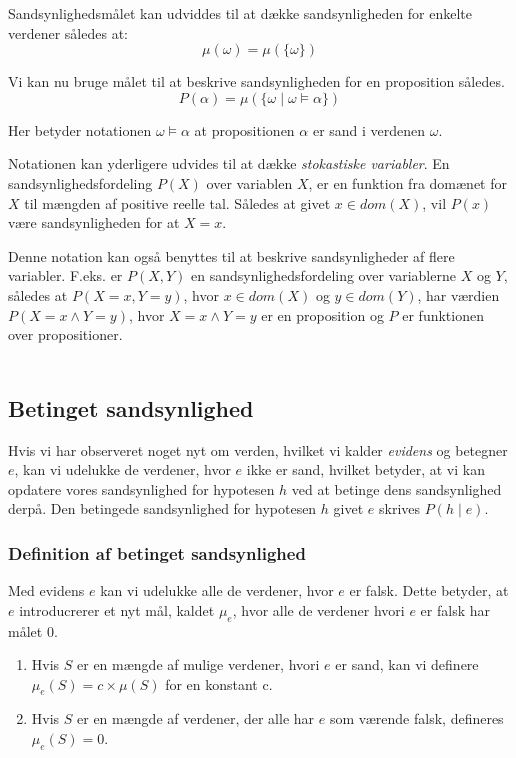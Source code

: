 Sandsynlighedsmålet kan udviddes til at dække sandsynligheden for enkelte verdener således at:
\begin{equation}
\mu(\omega) = \mu(\{\omega\})
\end{equation}


Vi kan nu bruge målet til at beskrive sandsynligheden for en proposition således.
\begin{equation}
P(\alpha) = \mu(\{\omega \mid \omega \models \alpha \})
\end{equation}

Her betyder notationen $\omega \models \alpha$ at propositionen $\alpha$ er sand i verdenen $\omega$.


Notationen kan yderligere udvides til at dække \emph{stokastiske variabler}.
En sandsynlighedsfordeling $P(X)$ over variablen $ X $, er en funktion fra
domænet for $ X $ til mængden af positive reelle tal.
Således at givet $x \in dom(X)$, vil $P(x)$ være sandsynligheden for at $X = x$.

Denne notation kan også benyttes til at beskrive sandsynligheder af flere variabler.
F.eks. er $P(X,Y)$ en sandsynlighedsfordeling over variablerne $ X $ og $ Y $, 
således at $P(X = x, Y = y)$, hvor $x \in dom(X)$ og $y \in dom(Y)$, 
har værdien $P(X = x \wedge Y = y)$, hvor
$X = x \wedge Y = y$ er en proposition og $ P $ er funktionen over propositioner. \\ \\
\cite[s. 221-222]{ArtificialIntelligence}

\subsection{Betinget sandsynlighed}

Hvis vi har observeret noget nyt om verden, hvilket vi kalder \emph{evidens} og betegner $ e $, kan vi udelukke de verdener,
hvor $ e $ ikke er sand, hvilket betyder, at vi kan opdatere vores sandsynlighed for hypotesen $ h $ ved at betinge dens sandsynlighed derpå.
Den betingede sandsynlighed for hypotesen $ h $ givet $ e $ skrives $P(h \mid e)$.


\subsubsection{Definition af betinget sandsynlighed}
Med evidens $e$ kan vi udelukke alle de verdener, hvor $e$ er falsk.
Dette betyder, at $e$ introducrerer et nyt mål, kaldet $\mu_e$, hvor
alle de verdener hvori $e$ er falsk har målet $0$.
\begin{enumerate}
    \item Hvis $S$ er en mængde af mulige verdener, hvori $e$ er sand, 
kan vi definere $\mu_e(S) = c \times \mu(S)$ for en konstant c. 
    \item Hvis $S$ er en mængde af verdener, der alle har $e$ som værende falsk, defineres $\mu_e(S) = 0$.
\end{enumerate}

